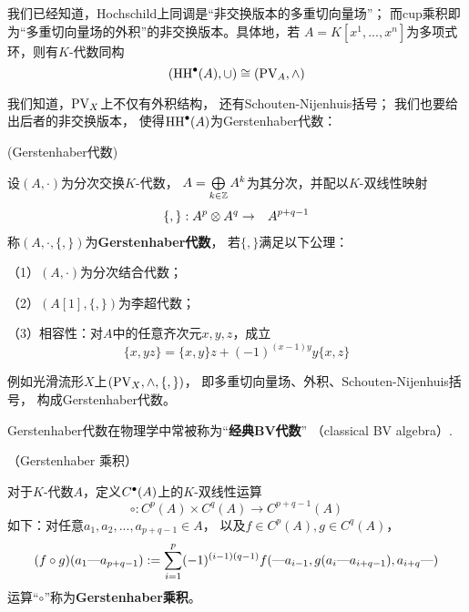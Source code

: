 \begin{rem}%
我们已经知道，Hochschild上同调是“非交换版本的多重切向量场”；
而cup乘积即为“多重切向量场的外积”的非交换版本。具体地，若
$A=K[x^1,...,x^n]$为多项式环，则有$K$-代数同构
$$(\operatorname{HH}^{\bullet}(A),\cup)\cong (\operatorname{PV}_A,\wedge)$$
\end{rem}

我们知道，$\operatorname{PV}_X$上不仅有外积结构，
还有Schouten-Nijenhuis括号；
我们也要给出后者的非交换版本，
使得$\operatorname{HH}^{\bullet}(A)$为Gerstenhaber代数：

\begin{definition}(Gerstenhaber代数)

设$(A,\cdot)$为分次交换$K$-代数，
$A=\bigoplus\limits_{k\in\mathbb{Z}}A^k$为其分次，并配以$K$-双线性映射
\begin{eqnarray*}
\{,\}:A^p\otimes A^q&\to& A^{p+q-1}
\end{eqnarray*}
称$(A,\cdot,\{,\})$为\textbf{Gerstenhaber代数}，
若$\{,\}$满足以下公理：

（1）$(A,\cdot)$为分次结合代数；

（2）$(A[1],\{,\})$为李超代数；

（3）相容性：对$A$中的任意齐次元$x,y,z$，成立
$$\{x,yz\}=\{x,y\}z+(-1)^{(x-1)y}y\{x,z\}$$
\label{Gerstenhaber代数-def}
\end{definition}
例如光滑流形$X$上$(\operatorname{PV}_X,\wedge,\{,\})$，
即多重切向量场、外积、Schouten-Nijenhuis括号，
构成Gerstenhaber代数。

Gerstenhaber代数在物理学中常被称为“\textbf{经典BV代数}”
（classical BV algebra）.



\begin{definition}（Gerstenhaber 乘积）

对于$K$-代数$A$，定义$C^{\bullet}(A)$上的$K$-双线性运算
$$\circ:C^{p}(A)\times C^q(A)\to C^{p+q-1}(A)$$
如下：对任意$a_1,a_2,...,a_{p+q-1}\in A$，
以及$f\in C^p(A),g\in C^q(A)$，
$$(f\circ g)(a_1\text{---} a_{p+q-1})
:=\sum_{i=1}^p(-1)^{(i-1)(q-1)}
    f(\text{---} a_{i-1},g(a_i\text{---} a_{i+q-1}),a_{i+q}\text{---})$$
运算“$\circ$”称为\textbf{Gerstenhaber乘积}。
\end{definition}

